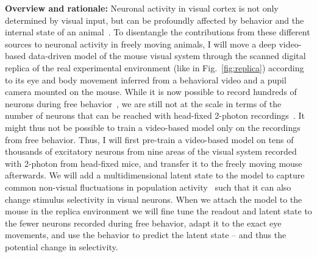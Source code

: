 \documentclass[B2,COG]{ercgrant}
\begin{document}
\textbf{Overview and rationale:} Neuronal activity  in visual cortex is not only determined by visual input, but can be profoundly affected by behavior and the internal state of an animal~\parencite{Niell2010-bs,Musall2019-kd,Stringer2019-lt, Franke2022-do}.
To disentangle the contributions from these different sources to neuronal activity in freely moving animals, I will move a deep video-based data-driven model of the mouse visual system through the scanned digital replica  of the real experimental environment (like in Fig.~\ref{fig:replica}) according to its eye and body movement inferred from a behavioral video and a pupil camera mounted on the mouse. 
While it is now possible to record hundreds of neurons during free behavior~\parencite{Parker2022-ac}, we are still not at the scale in terms of the number of neurons that can be reached with head-fixed 2-photon recordings~\parencite{Sofroniew2016-xg}. 
It might thus not be possible to train a video-based model only on the recordings from free behavior. 
Thus, I will first pre-train a video-based model on tens of thousands of excitatory neurons from nine areas of the visual system recorded with 2-photon from head-fixed mice, and transfer it to the freely moving mouse afterwards.
We will add a multidimensional latent state to the model to capture common non-visual fluctuations in population activity~\parencite{Bashiri2021-or} such that it can also change stimulus selectivity in visual neurons.
When we attach the model to the mouse in the replica environment we will fine tune the readout and latent state to the fewer neurons recorded during free behavior, adapt it to the exact eye movements, and use the behavior to predict  the latent state -- and thus the potential change in selectivity.
\end{document}

